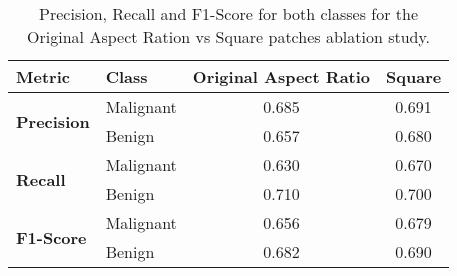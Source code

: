 \begin{table}[htbp]
    \centering
    \label{tab:ablation-patches}
    \begin{tabular}{llcc}
        \toprule
        \textbf{Metric} & \textbf{Class} & \textbf{Original Aspect Ratio} & \textbf{Square} \\
        \midrule
        \multirow{2}{*}{\textbf{Precision}} & Malignant & 0.685 & 0.691 \\
        & Benign    & 0.657 & 0.680 \\
        \midrule
        \multirow{2}{*}{\textbf{Recall}}    & Malignant & 0.630 & 0.670 \\
        & Benign    & 0.710 & 0.700 \\
        \midrule
        \multirow{2}{*}{\textbf{F1-Score}}  & Malignant & 0.656 & 0.679 \\
        & Benign    & 0.682 & 0.690 \\
        \bottomrule
    \end{tabular}
    \caption{Precision, Recall and F1-Score for both classes for the Original Aspect Ration vs Square patches ablation study.}
\end{table}
